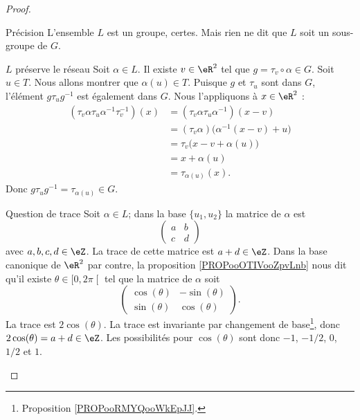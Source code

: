 \begin{proof}
\begin{subproof}
		\item[Précision]
		L'ensemble \( L\) est un groupe, certes. Mais rien ne dit que \( L\) soit un sous-groupe de \( G\).

		\item[\( L\) préserve le réseau]
		Soit \( \alpha\in L\). Il existe \( v\in \eR^2\) tel que \( g=\tau_v\circ \alpha\in G\). Soit \( u\in T\). Nous allons montrer que \( \alpha(u)\in T\). Puisque \( g\) et \( \tau_u\) sont dans \( G\), l'élément \( g\tau_u g^{-1}\) est également dans \( G\). Nous l'appliquons à \( x\in \eR^2\) :
		\begin{subequations}
			\begin{align}
				(\tau_v\alpha\tau_u\alpha^{-1}\tau_v^{-1})(x) & =(\tau_v\alpha\tau_u\alpha^{-1})(x-v)            \\
				                                              & =(\tau_v\alpha)\big( \alpha^{-1}(x-v)+u \big)    \\
				                                              & =\tau_v\big( x-v+\alpha(u) \big)                 \\
				                                              & =x+\alpha(u)                                     \\
				                                              & =\tau_{\alpha(u)}(x).
			\end{align}
		\end{subequations}
		Donc \( g\tau_ug^{-1}=\tau_{\alpha(u)}\in G\).

		\item[Question de trace]
		Soit \( \alpha\in L\); dans la base \( \{ u_1,u_2 \}\) la matrice de \( \alpha\) est
		\begin{equation}
			\begin{pmatrix}
				a & b \\
				c & d
			\end{pmatrix}
		\end{equation}
		avec \( a,b,c,d\in \eZ\). La trace de cette matrice est \( a+d\in \eZ\). Dans la base canonique de \( \eR^2\) par contre, la proposition \ref{PROPooOTIVooZpvLnb} nous dit qu'il existe \( \theta\in \mathopen[ 0 , 2\pi \mathclose[\) tel que la matrice de \( \alpha\) soit
		\begin{equation}
			\begin{pmatrix}
				\cos(\theta) & -\sin(\theta) \\
				\sin(\theta) & \cos(\theta)
			\end{pmatrix}.
		\end{equation}
		La trace est \( 2\cos(\theta)\). La trace est invariante par changement de base\footnote{Proposition \ref{PROPooRMYQooWkEpJJ}.}, donc \( 2\cos(\theta)=a+d\in \eZ\). Les possibilités pour \( \cos(\theta)\) sont donc \( -1\), \( -1/2\), \( 0\), \( 1/2\) et \( 1\).


\end{subproof}
\end{proof}
